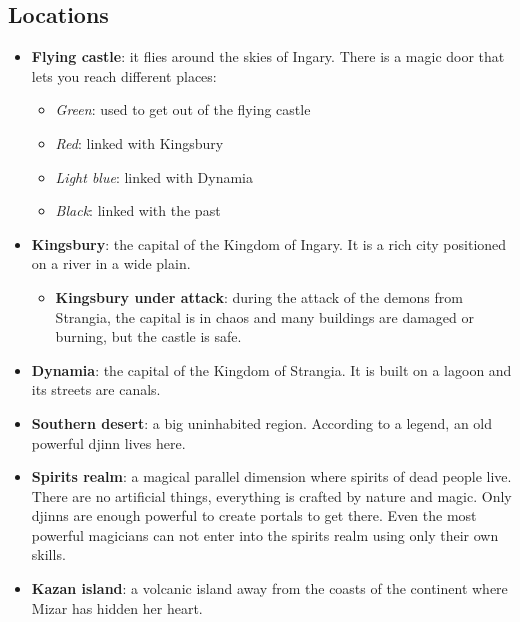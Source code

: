 \subsection{Locations}
\begin{itemize}
	\item \textbf{Flying castle}: it flies around the skies of Ingary. There is a magic door that lets you reach different places:
	\begin{itemize}
		\item \textit{Green}: used to get out of the flying castle
		\item \textit{Red}: linked with Kingsbury
		\item \textit{Light blue}: linked with Dynamia
		\item \textit{Black}: linked with the past
	\end{itemize}
	
	\item \textbf{Kingsbury}: the capital of the Kingdom of Ingary. It is a rich city positioned on a river in a wide plain.
	
\begin{itemize}
	\item \textbf{Kingsbury under attack}: during the attack of the demons from Strangia, the capital is in chaos and many buildings are damaged or burning, but the castle is safe.
\end{itemize}
	
	\item \textbf{Dynamia}: the capital of the Kingdom of Strangia. It is built on a lagoon and its streets are canals.
	
	\item \textbf{Southern desert}: a big uninhabited region. According to a legend, an old powerful djinn lives here.
	
	\item \textbf{Spirits realm}: a magical parallel dimension where spirits of dead people live. There are no artificial things, everything is crafted by nature and magic. Only djinns are enough powerful to create portals to get there. Even the most powerful magicians can not enter into the spirits realm using only their own skills.

	\item \textbf{Kazan island}: a volcanic island away from the coasts of the continent where Mizar has hidden her heart.
	
\end{itemize}
